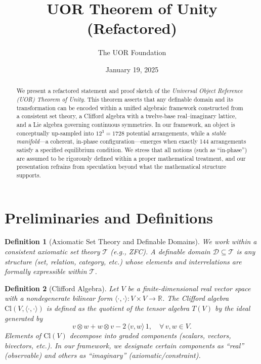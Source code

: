 \documentclass{article}
\newtheorem{definition}{Definition}[section]
\begin{document}
\title{UOR Theorem of Unity (Refactored)}
\author{The UOR Foundation}
\date{January 19, 2025}
\maketitle

\begin{abstract}
We present a refactored statement and proof sketch of the \emph{Universal Object Reference (UOR) Theorem of Unity}. This theorem asserts that any definable domain and its transformation can be encoded within a unified algebraic framework constructed from a consistent set theory, a Clifford algebra with a twelve-base real--imaginary lattice, and a Lie algebra governing continuous symmetries. In our framework, an object is conceptually up-sampled into $12^3 = 1728$ potential arrangements, while a \emph{stable manifold}---a coherent, in-phase configuration---emerges when exactly 144 arrangements satisfy a specified equilibrium condition. We stress that all notions (such as ``in-phase'') are assumed to be rigorously defined within a proper mathematical treatment, and our presentation refrains from speculation beyond what the mathematical structure supports.
\end{abstract}

\section{Preliminaries and Definitions}

\begin{definition}[Axiomatic Set Theory and Definable Domains]
\label{def:settheory}
We work within a consistent axiomatic set theory $\mathcal{T}$ (e.g., ZFC). A \emph{definable domain} $\mathcal{D} \subseteq \mathcal{T}$ is any structure (set, relation, category, etc.) whose elements and interrelations are formally expressible within $\mathcal{T}$.
\end{definition}

\begin{definition}[Clifford Algebra]
\label{def:clifford}
Let $V$ be a finite-dimensional real vector space with a nondegenerate bilinear form $\langle \cdot, \cdot \rangle: V\times V \to \mathbb{R}$. The \emph{Clifford algebra} $\mathrm{Cl}(V,\langle\cdot,\cdot\rangle)$ is defined as the quotient of the tensor algebra $T(V)$ by the ideal generated by 
\[
v \otimes w + w \otimes v - 2\,\langle v,w\rangle\,1,\quad \forall\, v,w\in V.
\]
Elements of $\mathrm{Cl}(V)$ decompose into graded components (scalars, vectors, bivectors, etc.). In our framework, we designate certain components as ``real'' (observable) and others as ``imaginary'' (axiomatic/constraint).
\end{definition}
\end{document}
